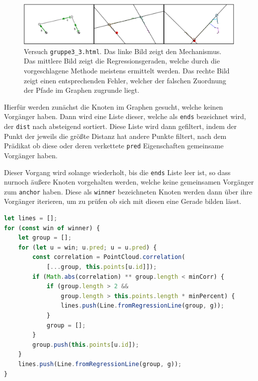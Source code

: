 \begin{figure}
    \centering
    \includegraphics[width=\textwidth]{gfx/correlation_edit.png}
    \caption[Versuch \lstinline{gruppe3_3.html}]{Versuch \lstinline{gruppe3_3.html}. Das linke Bild zeigt den Mechanismus. Das mittlere Bild zeigt die Regressionsgeraden, welche durch die vorgeschlagene Methode meistens ermittelt werden. Das rechte Bild zeigt einen entsprechenden Fehler, welcher der falschen Zuordnung der Pfade im Graphen zugrunde liegt.}
    \label{fig:gruppe3_3}
\end{figure}

Hierfür werden zunächst die Knoten im Graphen gesucht, welche keinen Vorgänger haben.
Dann wird eine Liste dieser, welche als \lstinline{ends} bezeichnet wird, der \lstinline{dist} nach absteigend sortiert.
Diese Liste wird dann gefiltert, indem der Punkt der jeweils die grö{\ss}te Distanz hat andere Punkte filtert, nach dem Prädikat ob diese oder deren verkettete \lstinline{pred} Eigenschaften gemeinsame Vorgänger haben.

Dieser Vorgang wird solange wiederholt, bis die \lstinline{ends} Liste leer ist, so dass nurnoch äu{\ss}ere Knoten vorgehalten werden, welche keine gemeinsamen Vorgänger zum \lstinline{anchor} haben.
Diese als \lstinline{winner} bezeichneten Knoten werden dann über ihre Vorgänger iterieren, um zu prüfen ob sich mit diesen eine Gerade bilden lässt.

\begin{lstlisting}[language=JavaScript, caption={Bestimmung der äu{\ss}ersten Knoten zur Bestimmung von Geraden durch den Korrelationskoeffizienten in der \lstinline{groupsByCorrelation} Funktion innerhalb der \lstinline{Dijkstra} Klasse.}, label={lst:dijkstra_correlation_part2}]
let lines = [];
for (const win of winner) {
    let group = [];
    for (let u = win; u.pred; u = u.pred) {
        const correlation = PointCloud.correlation(
            [...group, this.points[u.id]]);
        if (Math.abs(correlation) ** group.length < minCorr) {
            if (group.length > 2 &&
                group.length > this.points.length * minPercent) {
                lines.push(Line.fromRegressionLine(group, g));
            }
            group = [];
        }
        group.push(this.points[u.id]);
    }
    lines.push(Line.fromRegressionLine(group, g));
}
\end{lstlisting}

